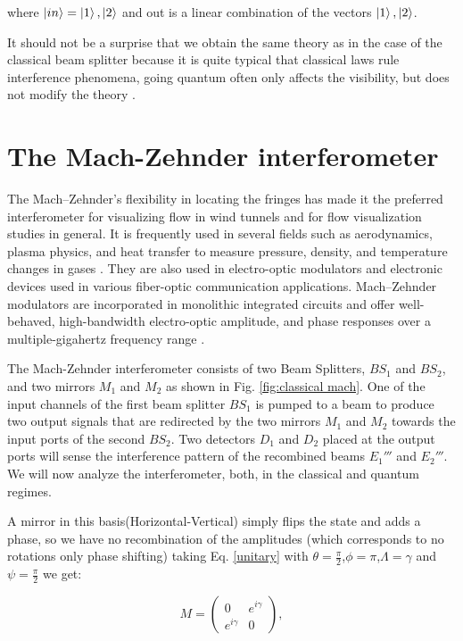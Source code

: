 \documentclass{book}
\begin{document}
where $\ket{in}=\ket{1},\ket{2}$ and out is a linear combination of the vectors $\ket{1},\ket{2}$.

 It should not be a surprise that we obtain the same theory as in the case of the classical beam splitter because it is quite typical that classical laws rule interference phenomena, going quantum often only affects the visibility, but does not modify the theory \cite{leonhardt}.

\pagebreak
\chapter{The Mach-Zehnder interferometer }


 The Mach–Zehnder's flexibility in locating the fringes has made it the preferred interferometer for visualizing flow in wind tunnels \cite{10} and for flow visualization studies in general. It is frequently used in several fields such as aerodynamics, plasma physics, and heat transfer to measure pressure, density, and temperature changes in gases \cite{11}. They are also used in electro-optic modulators \cite{ackerman} and electronic devices used in various fiber-optic communication applications. Mach–Zehnder modulators are incorporated in monolithic integrated circuits and offer well-behaved, high-bandwidth electro-optic amplitude, and phase responses over a multiple-gigahertz frequency range \cite{studenkov,capmany}.

The Mach-Zehnder interferometer consists of two Beam Splitters, $BS_{1}$ and $BS_{2}$, and two mirrors $M_{1}$ and $M_{2}$ as shown in Fig. \ref{fig:classical mach}. One of the input channels of the first beam splitter $BS_{1}$ is pumped to a beam to produce two output signals that are redirected by the two mirrors $M_{1}$ and $M_{2}$ towards the input ports of the second $BS_{2}$.  Two detectors $D_{1}$ and $D_{2}$ placed at the output ports will  sense the interference pattern of the recombined beams $E_{1}'''$ and $E_{2}'''$. We will now analyze the interferometer, both, in the classical and quantum regimes.


 A mirror in this basis(Horizontal-Vertical) simply flips the state and adds a phase, so we have no recombination of the amplitudes (which corresponds to no rotations only phase shifting) taking Eq. \ref{unitary} with $\theta=\frac{\pi}{2}$,$\phi=\pi$,$\Lambda=\gamma$ and $\psi= \frac{\pi}{2} $ we get:

 
\begin{equation}
M=\begin{pmatrix} 0& e^{i\gamma}  \\ e^{i\gamma} & 0 \end{pmatrix}, \label{mirror}
\end{equation}
\end{document}
